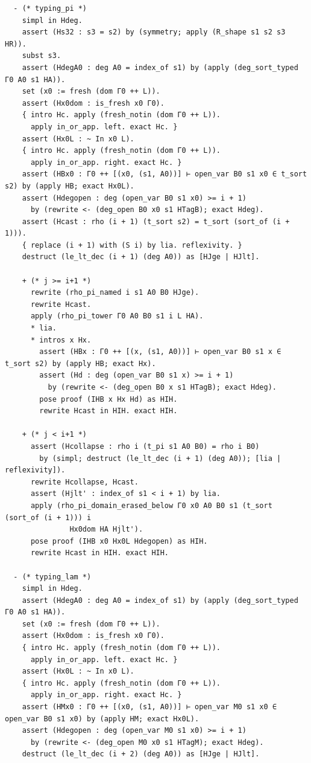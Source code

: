 \begin{latin}
\begin{verbatim}
  - (* typing_pi *)
    simpl in Hdeg.
    assert (Hs32 : s3 = s2) by (symmetry; apply (R_shape s1 s2 s3 HR)).
    subst s3.
    assert (HdegA0 : deg A0 = index_of s1) by (apply (deg_sort_typed Γ0 A0 s1 HA)).
    set (x0 := fresh (dom Γ0 ++ L)).
    assert (Hx0dom : is_fresh x0 Γ0).
    { intro Hc. apply (fresh_notin (dom Γ0 ++ L)).
      apply in_or_app. left. exact Hc. }
    assert (Hx0L : ~ In x0 L).
    { intro Hc. apply (fresh_notin (dom Γ0 ++ L)).
      apply in_or_app. right. exact Hc. }
    assert (HBx0 : Γ0 ++ [(x0, (s1, A0))] ⊢ open_var B0 s1 x0 ∈ t_sort s2) by (apply HB; exact Hx0L).
    assert (Hdegopen : deg (open_var B0 s1 x0) >= i + 1)
      by (rewrite <- (deg_open B0 x0 s1 HTagB); exact Hdeg).
    assert (Hcast : rho (i + 1) (t_sort s2) = t_sort (sort_of (i + 1))).
    { replace (i + 1) with (S i) by lia. reflexivity. }
    destruct (le_lt_dec (i + 1) (deg A0)) as [HJge | HJlt].

    + (* j >= i+1 *)
      rewrite (rho_pi_named i s1 A0 B0 HJge).
      rewrite Hcast.
      apply (rho_pi_tower Γ0 A0 B0 s1 i L HA).
      * lia.
      * intros x Hx.
        assert (HBx : Γ0 ++ [(x, (s1, A0))] ⊢ open_var B0 s1 x ∈ t_sort s2) by (apply HB; exact Hx).
        assert (Hd : deg (open_var B0 s1 x) >= i + 1)
          by (rewrite <- (deg_open B0 x s1 HTagB); exact Hdeg).
        pose proof (IHB x Hx Hd) as HIH.
        rewrite Hcast in HIH. exact HIH.

    + (* j < i+1 *)
      assert (Hcollapse : rho i (t_pi s1 A0 B0) = rho i B0)
        by (simpl; destruct (le_lt_dec (i + 1) (deg A0)); [lia | reflexivity]).
      rewrite Hcollapse, Hcast.
      assert (Hjlt' : index_of s1 < i + 1) by lia.
      apply (rho_pi_domain_erased_below Γ0 x0 A0 B0 s1 (t_sort (sort_of (i + 1))) i
               Hx0dom HA Hjlt').
      pose proof (IHB x0 Hx0L Hdegopen) as HIH.
      rewrite Hcast in HIH. exact HIH.

  - (* typing_lam *)
    simpl in Hdeg.
    assert (HdegA0 : deg A0 = index_of s1) by (apply (deg_sort_typed Γ0 A0 s1 HA)).
    set (x0 := fresh (dom Γ0 ++ L)).
    assert (Hx0dom : is_fresh x0 Γ0).
    { intro Hc. apply (fresh_notin (dom Γ0 ++ L)).
      apply in_or_app. left. exact Hc. }
    assert (Hx0L : ~ In x0 L).
    { intro Hc. apply (fresh_notin (dom Γ0 ++ L)).
      apply in_or_app. right. exact Hc. }
    assert (HMx0 : Γ0 ++ [(x0, (s1, A0))] ⊢ open_var M0 s1 x0 ∈ open_var B0 s1 x0) by (apply HM; exact Hx0L).
    assert (Hdegopen : deg (open_var M0 s1 x0) >= i + 1)
      by (rewrite <- (deg_open M0 x0 s1 HTagM); exact Hdeg).
    destruct (le_lt_dec (i + 2) (deg A0)) as [HJge | HJlt].


\end{verbatim}
\end{latin}
